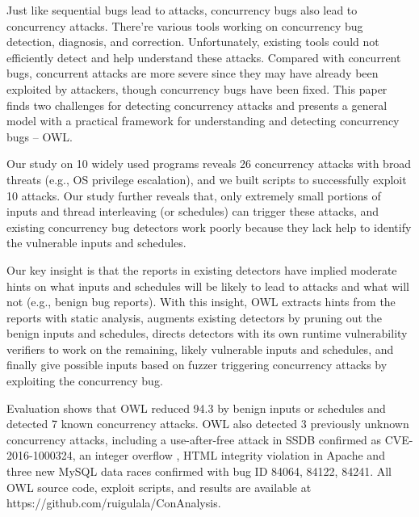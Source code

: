 Just like sequential bugs lead to attacks, concurrency bugs also lead to concurrency attacks. There're various tools working on concurrency bug detection, diagnosis, and correction. Unfortunately, existing tools could not efficiently detect and help 
understand these attacks. Compared with concurrent bugs, concurrent attacks are more severe since they may have already been exploited by attackers, though concurrency bugs have been fixed. 
This paper finds two challenges for detecting concurrency attacks and presents a general model with a practical framework for understanding and detecting concurrency bugs -- OWL.

Our study on 10 widely used programs reveals 26 concurrency attacks
with broad threats (e.g., OS privilege escalation), and we built
scripts to successfully exploit 10 attacks. Our study further reveals
that, only extremely small portions of inputs and thread
interleaving (or schedules) can trigger these attacks, and existing
concurrency bug detectors work poorly because they
lack help to identify the vulnerable inputs and schedules.

Our key insight is that the reports in existing detectors have
implied moderate hints on what inputs and schedules will be likely to lead to attacks and what will not (e.g., benign bug reports).
With this insight, OWL extracts hints from the reports with static analysis, augments existing detectors by pruning out the benign inputs
and schedules, directs detectors with its own runtime
vulnerability verifiers to work on the remaining, likely
vulnerable inputs and schedules, and finally give possible inputs based on fuzzer triggering concurrency attacks by exploiting the concurrency bug.

Evaluation shows that OWL reduced 94.3%
by benign inputs or schedules and detected 7 known concurrency
attacks. OWL also detected 3 previously unknown
concurrency attacks, including a use-after-free attack in SSDB
confirmed as CVE-2016-1000324, an integer overflow ,
HTML integrity violation in Apache and three new MySQL
data races confirmed with bug ID 84064, 84122, 84241. All
OWL source code, exploit scripts, and results are available at
https://github.com/ruigulala/ConAnalysis.